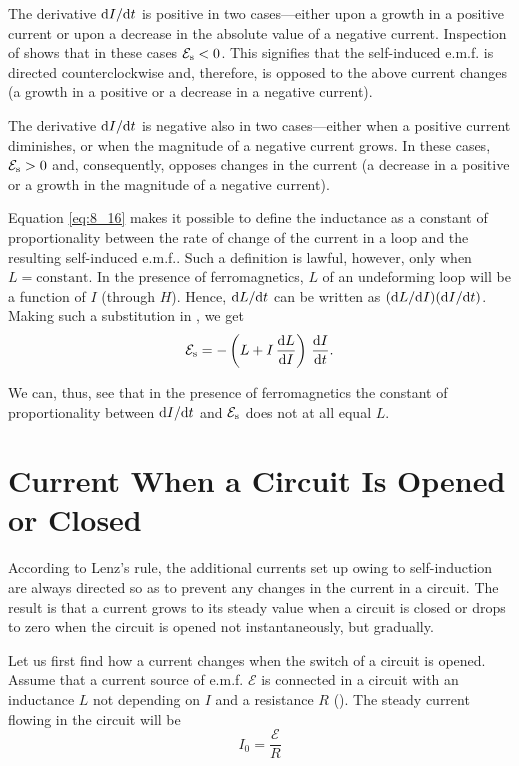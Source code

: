 The derivative $\mathrm{d} I/\mathrm{d} t$ is positive in two cases---either upon a growth in a positive current or upon a decrease in the absolute value of a negative current.
Inspection of  shows that in these cases $\mathcal{E}_{\text{s}}<0$.
This signifies that the self-induced e.m.f. is directed counterclockwise and, therefore, is opposed to the above current changes (a growth in a positive or a decrease in a negative current).

The derivative $\mathrm{d} I/\mathrm{d} t$ is negative also in two cases---either when a positive current diminishes, or when the magnitude of a negative current grows. In these cases, $\mathcal{E}_{\text{s}}>0$ and, consequently, opposes changes in the current (a decrease in a positive or a growth in the
magnitude of a negative current).

Equation \eqref{eq:8_16} makes it possible to define the inductance as a constant of proportionality between the rate of change of the current in a loop and the resulting self-induced e.m.f..
Such a definition is lawful, however, only when $L=\text{constant}$.
In the presence of ferromagnetics, $L$ of an undeforming loop will be a function of $I$ (through $H$).
Hence, $\mathrm{d} L/\mathrm{d} t$ can be written as $(\mathrm{d} L/\mathrm{d} I)(\mathrm{d} I/\mathrm{d} t)$.
Making such a substitution in , we get
\begin{equation}\label{eq:8_17}
	\mathcal{E}_{\text{s}} = - \left(L + I\, \dfrac{\mathrm{d} L}{\mathrm{d} I}\right)\, \dfrac{\mathrm{d} I}{\mathrm{d} t}.
\end{equation}

\noindent
We can, thus, see that in the presence of ferromagnetics the constant of proportionality between $\mathrm{d} I/\mathrm{d} t$ and $\mathcal{E}_{\text{s}}$ does not at all equal $L$.

\section{Current When a Circuit Is Opened or Closed}\label{sec:8_6}

According to Lenz's rule, the additional currents set up owing to self-induction are always directed so as to prevent any changes in the current in a circuit.
The result is that a current grows to its steady value when a circuit is closed or drops to zero when the circuit is opened not instantaneously, but gradually.

Let us first find how a current changes when the switch of a circuit is opened.
Assume that a current source of e.m.f. $\mathcal{E}$ is connected in a circuit with an inductance $L$ not depending on $I$ and a resistance $R$ ().
The steady current flowing in the circuit will be
\begin{equation}\label{eq:8_18}
	I_0 = \frac{\mathcal{E}}{R}
\end{equation}

